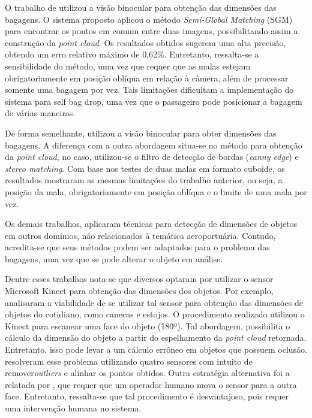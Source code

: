     O trabalho de  utilizou a visão binocular para obtenção das dimensões das bagagens. O sistema proposto aplicou o método \textit{Semi-Global Matching} (SGM) para encontrar os pontos em comum entre duas imagens, possibilitando assim a construção da \textit{point cloud}. Os resultados obtidos sugerem uma alta precisão, obtendo um erro relativo máximo de 0,62\%. Entretanto, ressalta-se a sensibilidade do método, uma vez que requer que as malas estejam obrigatoriamente em posição oblíqua em relação à câmera, além de processar somente uma bagagem por vez. Tais limitações dificultam a implementação do sistema para self bag drop, uma vez que o passageiro pode posicionar a bagagem de várias maneiras. 
    
    De forma semelhante,  utilizou a visão binocular para obter dimensões das bagagens. A diferença com a outra abordagem situa-se no método para obtenção da \textit{point cloud}, no caso, utilizou-se o filtro de detecção de bordas (\textit{canny edge}) e \textit{stereo matching}. Com base nos testes de duas malas em formato cuboide, os resultados mostraram as mesmas limitações do trabalho anterior, ou seja, a posição da mala, obrigatoriamente em posição oblíqua e o limite de uma mala por vez. 
    
    Os demais trabalhos, aplicaram técnicas para detecção de dimensões de objetos em outros domínios, não relacionados à temática aeroportuária. Contudo, acredita-se que seus métodos podem ser adaptados para o problema das bagagens, uma vez que se pode alterar o objeto em análise. 
    
    Dentre esses trabalhos nota-se que diversos optaram por utilizar o sensor Microsoft Kinect para obtenção das dimensões dos objetos. Por exemplo,  analisaram a viabilidade de se utilizar tal sensor para obtenção das dimensões de objetos do cotidiano, como canecas e estojos. O procedimento realizado utilizou o Kinect para escanear uma face do objeto (180º). Tal abordagem, possibilita o cálculo da dimensão do objeto a partir do espelhamento da \textit{point cloud} retornada. Entretanto, isso pode levar a um cálculo errôneo em objetos que possuem oclusão.  resolveram esse problema utilizando quatro sensores com intuito de remover\textit{outliers} e alinhar os pontos obtidos. Outra estratégia alternativa foi a relatada por , que requer que um operador humano mova o sensor para a outra face. Entretanto, ressalta-se que tal procedimento é desvantajoso, pois requer uma intervenção humana no sistema. 
    
